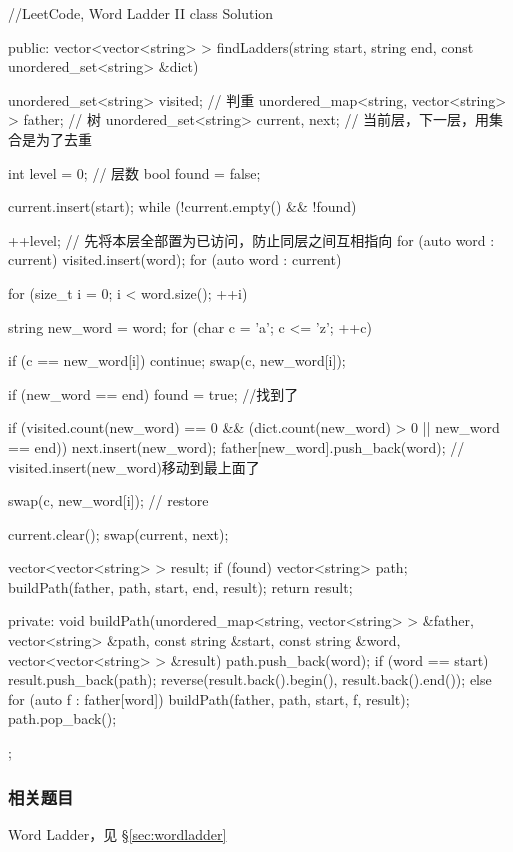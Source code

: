\begin{Code}
//LeetCode, Word Ladder II
class Solution {
public:
    vector<vector<string> > findLadders(string start, string end,
            const unordered_set<string> &dict) {
        unordered_set<string> visited; // 判重
        unordered_map<string, vector<string> > father; // 树
        unordered_set<string> current, next;  // 当前层，下一层，用集合是为了去重

        int level = 0; // 层数
        bool found = false;

        current.insert(start);
        while (!current.empty() && !found) {
            ++level;
            // 先将本层全部置为已访问，防止同层之间互相指向
            for (auto word : current)
                visited.insert(word);
            for (auto word : current) {
                for (size_t i = 0; i < word.size(); ++i) {
                    string new_word = word;
                    for (char c = 'a'; c <= 'z'; ++c) {
                        if (c == new_word[i]) continue;
                        swap(c, new_word[i]);

                        if (new_word == end) found = true; //找到了

                        if (visited.count(new_word) == 0
                                && (dict.count(new_word) > 0 ||
                                        new_word == end)) {
                            next.insert(new_word);
                            father[new_word].push_back(word);
                            // visited.insert(new_word)移动到最上面了
                        }

                        swap(c, new_word[i]);  // restore
                    }
                }
            }

            current.clear();
            swap(current, next);
        }
        vector<vector<string> > result;
        if (found) {
            vector<string> path;
            buildPath(father, path, start, end, result);
        }
        return result;
    }
private:
    void buildPath(unordered_map<string, vector<string> > &father,
            vector<string> &path, const string &start, const string &word,
            vector<vector<string> > &result) {
        path.push_back(word);
        if (word == start) {
            result.push_back(path);
            reverse(result.back().begin(), result.back().end());
        } else {
            for (auto f : father[word]) {
                buildPath(father, path, start, f, result);
            }
        }
        path.pop_back();
    }
};
\end{Code}


\subsubsection{相关题目}

\begindot
\item Word Ladder，见 \S \ref{sec:wordladder}
\myenddot
